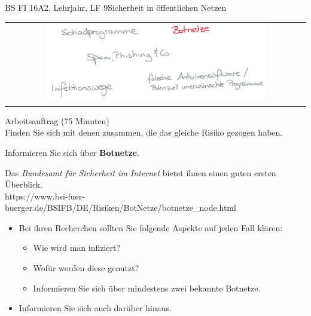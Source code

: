 \documentclass[oneside,openany,headings=optiontotoc,11pt,numbers=noenddot]{scrreprt}
\begin{document}
\begin{worksheet}{BS FI 16A}{2. Lehrjahr, LF 9}{Sicherheit in öffentlichen Netzen}
		\newpage
		\setcounter{page}{1}
		\begin{framed}
			\begin{tabular}{lcr}
				& \includegraphics[width=0.8\textwidth]{Bilder/Botnetze.jpg} & \\
			\end{tabular}
		\end{framed}
		\color{codegray}Arbeitsauftrag (75 Minuten)\\
		\color{black}
		Finden Sie sich mit denen zusammen, die das gleiche Risiko gezogen haben.
		\par
		\bigskip
		\noindent
		Informieren Sie sich über \textbf{Botnetze}.
		\par
		\bigskip
		\noindent
		Das \textit{Bundesamt für Sicherheit im Internet} bietet ihnen einen guten ersten Überblick.\\
		\small{\color{codegray}https://www.bsi-fuer-buerger.de/BSIFB/DE/Risiken/BotNetze/botnetze\_node.html}
		\normalsize
		\begin{itemize}
			\item[] Bei ihren Recherchen sollten Sie folgende Aspekte auf jeden Fall klären:
			\begin{itemize}
				\item Wie wird man infiziert?
				\item Wofür werden diese genutzt?
				\item Informieren Sie sich über mindestens zwei bekannte Botnetze.
			\end{itemize}
			\item[] Informieren Sie sich auch darüber hinaus.
		\end{itemize}
	

\end{worksheet}
\end{document}
